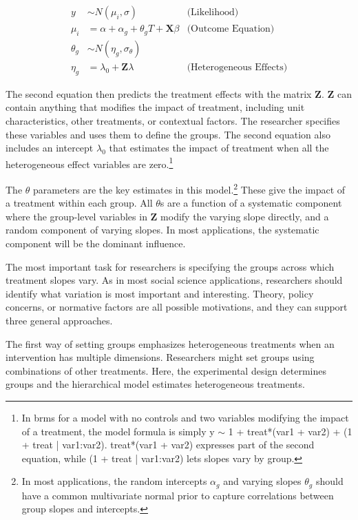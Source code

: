 \documentclass[12pt]{article}
\begin{document}
\begin{equation}
\begin{aligned}
y &\sim N(\mu_i, \sigma) &\text{(Likelihood)} \\
\mu_i &= \alpha + \alpha_g + \theta_g \textit{T} + \textbf{X} \beta &\text{(Outcome Equation)}  \\
\theta_g &\sim N(\eta_g, \sigma_\theta) \\ 
\eta_g &= \lambda_0 + \textbf{Z} \lambda &\text{(Heterogeneous Effects)} 
\end{aligned}
\end{equation}


The second equation then predicts the treatment effects with the matrix \textbf{Z}. 
\textbf{Z} can contain anything that modifies the impact of treatment, including unit characteristics, other treatments, or contextual factors. 
The researcher specifies these variables and uses them to define the groups.
The second equation also includes an intercept $\lambda_0$ that estimates the impact of treatment when all the heterogeneous effect variables are zero.\footnote{In brms for a model with no controls and two variables modifying the impact of a treatment, the model formula is simply y $\sim$ 1 + treat*(var1 + var2) + (1 + treat | var1:var2). treat*(var1 + var2) expresses part of the second equation, while (1 + treat | var1:var2) lets slopes vary by group.}


The $\theta$ parameters are the key estimates in this model.\footnote{In most applications, the random intercepts $\alpha_g$ and varying slopes $\theta_g$ should have a common multivariate normal prior to capture correlations between group slopes and intercepts.}
These give the impact of a treatment within each group.
All $\theta$s are a function of a systematic component where the group-level variables in \textbf{Z} modify the varying slope directly, and a random component of varying slopes. 
In most applications, the systematic component will be the dominant influence. 


The most important task for researchers is specifying the groups across which treatment slopes vary. 
As in most social science applications, researchers should identify what variation is most important and interesting. 
Theory, policy concerns, or normative factors are all possible motivations, and they can support three general approaches.  


The first way of setting groups emphasizes heterogeneous treatments when an intervention has multiple dimensions.
Researchers might set groups using combinations of other treatments. 
Here, the experimental design determines groups and the hierarchical model estimates heterogeneous treatments. 
\end{document}
